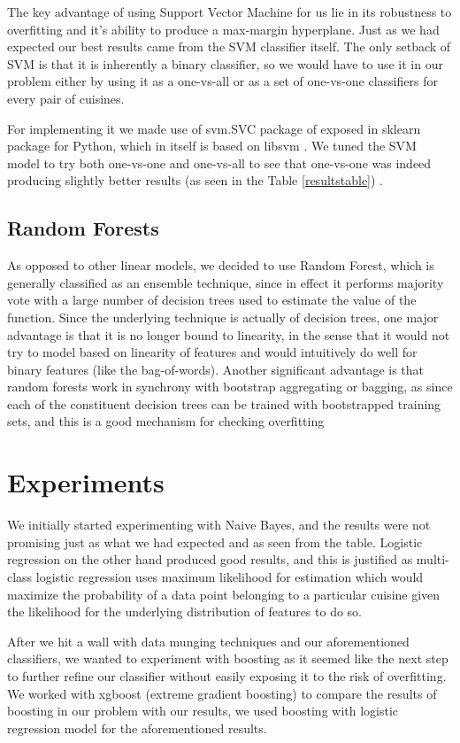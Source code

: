 \documentclass[prodmode,acmtap]{acmlarge}
\begin{document}
The key advantage of using Support Vector Machine for us lie in its robustness to overfitting and it’s ability to produce a max-margin hyperplane. Just as we had expected our best results came from the SVM classifier itself. The only setback of SVM is that it is inherently a binary classifier, so we would have to use it in our problem either by using  it as a one-vs-all or as a set of one-vs-one classifiers for every pair of cuisines. 

For implementing it we made use of svm.SVC package of exposed in sklearn package for Python, which in itself is based on libsvm \cite{scikitsvc}. We tuned the SVM model to try both one-vs-one and one-vs-all to see that one-vs-one was indeed producing slightly better results (as seen in the Table \ref{resultstable}) . 

\subsection{Random Forests}

As opposed to other linear models, we decided to use Random Forest, which is generally classified as an ensemble technique, since in effect it performs majority vote with a large number of decision trees used to estimate the value of the function. Since the underlying technique is actually of decision trees, one major advantage is that it is no longer bound to linearity, in the sense that it would not try to model based on linearity of features and would intuitively do well for binary features (like the bag-of-words). Another significant advantage is that random forests work in synchrony with bootstrap aggregating or bagging, as since each of the constituent decision trees can be trained with bootstrapped training sets, and this is a good mechanism for checking overfitting


\section {Experiments}
We initially started experimenting with Naive Bayes, and the results were not promising just as what we had expected and as seen from the table. Logistic regression on the other hand produced good results, and this is justified as multi-class logistic regression uses maximum likelihood for estimation which would maximize the probability of a data point belonging to a particular cuisine given the likelihood for the underlying distribution of features to do so.

After we hit a wall with data munging techniques and our aforementioned classifiers, we wanted to experiment with boosting as it seemed like the next step to further refine our classifier without easily exposing it to the risk of overfitting. We worked with xgboost (extreme gradient boosting) to compare the results of boosting in our problem with our results, we used boosting with logistic regression model for the aforementioned results.
\end{document}
